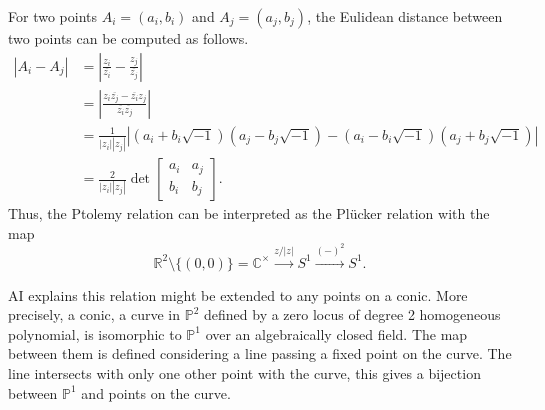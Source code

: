 \documentclass[11pt]{amsart}
\begin{document}
For two points $A_i = (a_i, b_i)$ and $A_j = (a_j, b_j)$, the Eulidean distance between two points can be computed as follows.
\begin{align*}
    |A_i - A_j| & = \left| \frac{z_i}{\overline{z_i}} - \frac{z_j}{\overline{z_j}} \right| \\
    & = \left| \frac{z_i \overline{z_j} - \overline{z_i}z_j}{\overline{z_i} \overline{z_j}} \right| \\
    & = \frac{1}{|z_i| |z_j|} \left| (a_i + b_i\sqrt{-1})(a_j - b_j\sqrt{-1}) - (a_i - b_i\sqrt{-1})(a_j + b_j\sqrt{-1}) \right| \\
    & = \frac{2}{|z_i| |z_j|} \det \begin{bmatrix}
        a_i & a_j \\ b_i & b_j
    \end{bmatrix}.
\end{align*}
Thus, the Ptolemy relation can be interpreted as the Pl\"ucker relation with the map
\[
    \mathbb{R}^2 \setminus \{ (0,0) \} = \mathbb{C}^\times \xrightarrow{z/|z|} S^1 \xrightarrow{(-)^2} S^1.
\]

AI explains this relation might be extended to any points on a conic.
More precisely, a conic, a curve in $\mathbb{P}^2$ defined by a zero locus of degree 2 homogeneous polynomial, is isomorphic to $\mathbb{P}^1$ over an algebraically closed field.
The map between them is defined considering a line passing a fixed point on the curve.
The line intersects with only one other point with the curve, this gives a bijection between $\mathbb{P}^1$ and points on the curve.

\par\vspace{1em}






\end{document}
